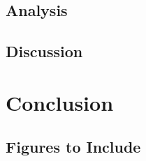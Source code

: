 \documentclass[12pt,a4paper,oneside]{report}
\begin{document}
\section{Analysis}

\section{Discussion}


\chapter{Conclusion}

\pagebreak
\section{Figures to Include}
\end{document}
